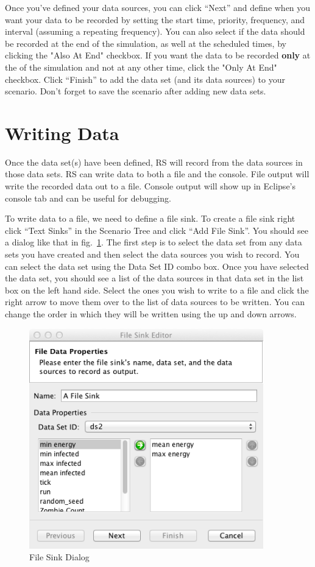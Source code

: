 \documentclass[11pt]{amsart}
\begin{document}
Once you've defined your data sources, you can click ``Next'' and define when you want your data to be recorded by setting the start time, priority, frequency, and interval (assuming a repeating frequency). You can also select if the data should be recorded at the end of the simulation, as well at the scheduled times, by clicking the "Also At End" checkbox. If you want the data to be recorded \textbf{only} at the of the simulation and not at any other time, click the "Only At End" checkbox.
Click ``Finish'' to add the data set (and its data sources) to your scenario. Don't forget to save the scenario after adding new data sets.

\section{Writing Data}
Once the data set(s) have been defined, RS will record from the data sources in those data sets. RS can write data to both a file and the console. File output will write the recorded data out to a file. Console output will show up in Eclipse's console tab and can be useful for debugging. 

To write data to a file, we need to define a file sink. To create a file sink right click ``Text Sinks'' in the Scenario Tree and click ``Add File Sink''. You should see a dialog like that in fig.~\ref{fig:fs}. The first step is to select the data set from any data sets you have created and then select the data sources you wish to record. You can select the data set using the Data Set ID combo box. Once you have selected the data set, you should see a list of the data sources in that data set in the list box on the left hand side. Select the ones you wish to write to a file and click the right arrow to move them over to the list of data sources to be written. You can change the order in which they will be written using the up and down arrows. 

\begin{figure}[h]
\begin{center}
\vspace{.2in}
\centerline {
\includegraphics[width=4in]{images/fs1.png}
}
\caption{File Sink Dialog}
\label{fig:fs}
\end{center}
\end{figure}
\end{document}
